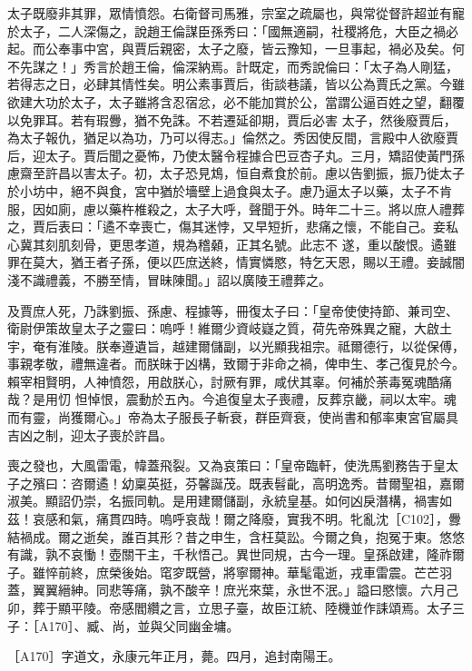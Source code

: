 \begin{pinyinscope}
 太子既廢非其罪，眾情憤怨。右衛督司馬雅，宗室之疏屬也，與常從督許超並有寵於太子，二人深傷之，說趙王倫謀臣孫秀曰：「國無適嗣，社稷將危，大臣之禍必起。而公奉事中宮，與賈后親密，太子之廢，皆云豫知，一旦事起，禍必及矣。何不先謀之！」秀言於趙王倫，倫深納焉。計既定，而秀說倫曰：「太子為人剛猛，若得志之日，必肆其情性矣。明公素事賈后，街談巷議，皆以公為賈氏之黨。今雖欲建大功於太子，太子雖將含忍宿忿，必不能加賞於公，當謂公逼百姓之望，翻覆以免罪耳。若有瑕釁，猶不免誅。不若遷延卻期，賈后必害
 太子，然後廢賈后，為太子報仇，猶足以為功，乃可以得志。」倫然之。秀因使反間，言殿中人欲廢賈后，迎太子。賈后聞之憂怖，乃使太醫令程據合巴豆杏子丸。三月，矯詔使黃門孫慮齋至許昌以害太子。初，太子恐見鴆，恒自煮食於前。慮以告劉振，振乃徙太子於小坊中，絕不與食，宮中猶於墻壁上過食與太子。慮乃逼太子以藥，太子不肯服，因如廁，慮以藥杵椎殺之，太子大呼，聲聞于外。時年二十三。將以庶人禮葬之，賈后表曰：「遹不幸喪亡，傷其迷悖，又早短折，悲痛之懷，不能自己。妾私心冀其刻肌刻骨，更思孝道，規為稽顙，正其名號。此志不
 遂，重以酸恨。遹雖罪在莫大，猶王者子孫，便以匹庶送終，情實憐愍，特乞天恩，賜以王禮。妾誠闇淺不識禮義，不勝至情，冒昧陳聞。」詔以廣陵王禮葬之。



 及賈庶人死，乃誅劉振、孫慮、程據等，冊復太子曰：「皇帝使使持節、兼司空、衛尉伊策故皇太子之靈曰：嗚呼！維爾少資岐嶷之質，荷先帝殊異之寵，大啟土宇，奄有淮陵。朕奉遵遺旨，越建爾儲副，以光顯我祖宗。祗爾德行，以從保傅，事親孝敬，禮無違者。而朕昧于凶構，致爾于非命之禍，俾申生、孝己復見於今。賴宰相賢明，人神憤怨，用啟朕心，討厥有罪，咸伏其辜。何補於荼毒冤魂酷痛哉？是用忉
 怛悼恨，震動於五內。今追復皇太子喪禮，反葬京畿，祠以太牢。魂而有靈，尚獲爾心。」帝為太子服長子斬衰，群臣齊衰，使尚書和郁率東宮官屬具吉凶之制，迎太子喪於許昌。



 喪之發也，大風雷電，幃蓋飛裂。又為哀策曰：「皇帝臨軒，使洗馬劉務告于皇太子之殯曰：咨爾遹！幼稟英挺，芬馨誕茂。既表髫齔，高明逸秀。昔爾聖祖，嘉爾淑美。顯詔仍崇，名振同軌。是用建爾儲副，永統皇基。如何凶戾潛構，禍害如茲！哀感和氣，痛貫四時。嗚呼哀哉！爾之降廢，實我不明。牝亂沈［C102］，釁結禍成。爾之逝矣，誰百其形？昔之申生，含枉莫訟。今爾之負，抱冤于東。悠悠
 有識，孰不哀慟！壺關干主，千秋悟己。異世同規，古今一理。皇孫啟建，隆祚爾子。雖悴前終，庶榮後始。窀穸既營，將寧爾神。華髦電逝，戎車雷震。芒芒羽蓋，翼翼縉紳。同悲等痛，孰不酸辛！庶光來葉，永世不泯。」謚曰愍懷。六月己卯，葬于顯平陵。帝感閻纘之言，立思子臺，故臣江統、陸機並作誄頌焉。太子三子：［A170］、臧、尚，並與父同幽金墉。



 ［A170］字道文，永康元年正月，薨。四月，追封南陽王。




\end{pinyinscope}
